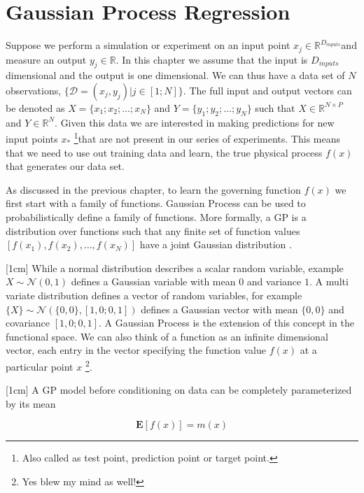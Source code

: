 \chapter{Gaussian Process Regression}
\label{chapGp}

Suppose we perform a simulation or experiment on an input point \(x_{j} \in \mathbb{R}^{D_{inputs}}\)and measure an output \(y_{j} \in \mathbb{R}\). In this chapter we assume that the input is \(D_{inputs}\) dimensional and the output is one dimensional. We can thus have a data set of \(N\) observations, \(\{\mathcal{D} = (x_{j}, y_{j}) | j \in [1; N] \}\). The full input and output vectors can be denoted as \(X = \{x_{1}; x_{2}; \ldots ; x_{N}\}\) and \(Y = \{y_{1}; y_{2}; \ldots ; y_{N}\}\) such that \(X \in \mathbb{R}^{N \times P}\) and \(Y \in \mathbb{R}^{N }\). Given this data we are interested in making predictions for new input points \(x_{*}\) \footnote{Also called as test point, prediction point or target point.}that are not present in our series of experiments. This means that we need to use out training data and learn, the true physical process  \(f(x)\) that generates our data set.

As discussed in the previous chapter, to learn the governing function \(f(x)\) we first start with a family of functions. Gaussian Process can be used to probabilistically define a family of functions. More formally, a GP is a distribution over functions such that any finite set of function values \([f(x_{1}), f(x_{2}), \ldots, f(x_{N})]\) have a joint Gaussian distribution \cite{rasmussen2006gaussian}. 

[1cm]
While a normal distribution describes a scalar random variable, example \(X \sim \mathcal{N}(0, 1)\) defines a Gaussian variable with mean \(0\) and variance \(1\). A multi variate distribution defines a vector of random variables, for example \(\{X\} \sim \mathcal{N}(\{0, 0\}, [1, 0; 0, 1])\) defines a Gaussian vector with mean \(\{0, 0\}\) and covariance \([1, 0; 0, 1]\). A Gaussian Process is the extension of this concept in the functional space. We can also think of a function as an infinite dimensional vector, each entry in the vector specifying the function value \(f(x)\) at a particular point \(x\) \footnote{Yes blew my mind as well!}. 

[1cm]
A GP model before conditioning on data can be completely parameterized by its mean

\begin{equation}\label{eq:meanGP}
\mathbf{E}[f(x)] = m(x)
\end{equation}

